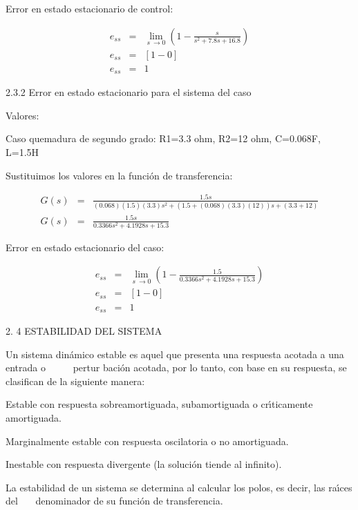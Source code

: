 \documentclass{article}
\begin{document}
Error en estado estacionario de control: 

\begin{eqnarray*}
e_{ss} &=&\lim_{s\ \rightarrow 0}\left( 1-\frac{s}{s^{2}+7.8s+16.8}\right) 
\\
e_{ss} &=&[1-0] \\
e_{ss} &=&1
\end{eqnarray*}

2.3.2 Error en estado estacionario para el sistema del caso 

Valores:

Caso quemadura de segundo grado: R1=3.3 ohm, R2=12 ohm, C=0.068F, L=1.5H

\bigskip 

Sustituimos los valores en la funci\'{o}n de transferencia: 

\bigskip 
\begin{eqnarray*}
G(s) &=&\frac{1.5s}{(0.068)(1.5)(3.3)s^{2}+(1.5+(0.068)(3.3)(12))s+(3.3+12)}
\\
G(s) &=&\frac{1.5s}{0.3366s^{2}+4.1928s+15.3}
\end{eqnarray*}

\bigskip 

Error en estado estacionario del caso: 

\begin{eqnarray*}
e_{ss} &=&\lim_{s\ \rightarrow 0}\left( 1-\frac{1.5}{0.3366s^{2}+4.1928s+15.3%
}\right)  \\
e_{ss} &=&[1-0] \\
e_{ss} &=&1
\end{eqnarray*}

\bigskip 

2. 4 ESTABILIDAD DEL SISTEMA 

Un sistema din\'{a}mico estable es aquel que presenta una respuesta acotada
a una entrada o \ \ \ \ \ pertur baci\'{o}n acotada, por lo tanto, con base
en su respuesta, se clasifican de la siguiente manera: 


Estable con respuesta sobreamortiguada, subamortiguada o cr\'{\i}ticamente
amortiguada. 

Marginalmente estable con respuesta oscilatoria o no amortiguada. 

Inestable con respuesta divergente (la soluci\'{o}n tiende al infinito). 


La estabilidad de un sistema se determina al calcular los polos, es decir,
las ra\'{\i}ces del \ \ \ denominador de su funci\'{o}n de transferencia. 

\bigskip 
\end{document}
